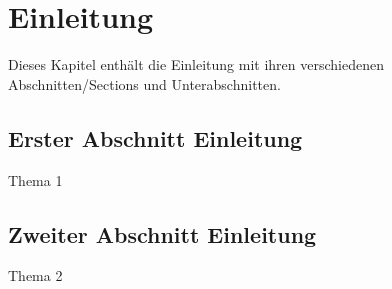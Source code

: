 \chapter{Einleitung}

\nocite{*}

Dieses Kapitel enthält die Einleitung mit ihren verschiedenen Abschnitten/Sections und Unterabschnitten.

\section{Erster Abschnitt Einleitung}

Thema 1

\section{Zweiter Abschnitt Einleitung}

Thema 2
